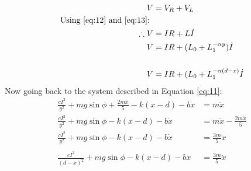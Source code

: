     \begin{align}
        V &= V_{R} + V_{L} \nonumber \\
        \text{Using \eqref{eq:12} and  \eqref{eq:13}: } \nonumber \\
        \therefore V &= IR + L \dot{I} \nonumber \\
        V &= IR + (L_{0} + L_{1}^{- \alpha y}) \dot{I} \nonumber \\
        \nonumber \\
        V &= IR + (L_{0} + L_{1}^{- \alpha (d - x)}\dot{I}
    \end{align}
    Now going back to the system described in Equation \eqref{eq:11}:
    \begin{align}
        \frac{cI^2}{y^2} + mg \sin{\phi} + \frac{2m \ddot{x}}{5} - k(x - d) - b \dot{x} &= m \ddot{x} \nonumber \\
        \frac{cI^2}{y^2} + mg \sin{\phi} - k(x -d) - b \dot{x} &= m \ddot{x} - \frac{2m \ddot{x}}{5} \nonumber \\
        \frac{cI^2}{y^2} + mg \sin{\phi} - k(x -d) - b \dot{x} &= \frac{3m}{5} \ddot{x} \nonumber \\
        \nonumber \\
        \frac{cI^2}{(d - x)^2} + mg \sin{\phi} - k(x -d) - b \dot{x} &= \frac{3m}{5} \ddot{x}
    \end{align}
    